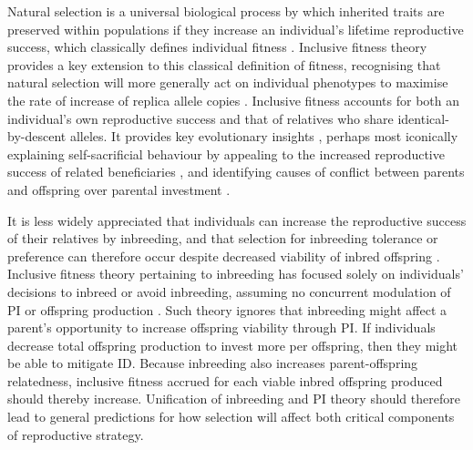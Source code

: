 \documentclass[12pt]{article}
\begin{document}
Natural selection is a universal biological process by which inherited traits are preserved within populations if they increase an individual's lifetime reproductive success, which classically defines individual fitness \cite[][]{Darwin1859, Dawkins1982}. Inclusive fitness theory \cite[][]{Hamilton1964, Hamilton1964a} provides a key extension to this classical definition of fitness, recognising that natural selection will more generally act on individual phenotypes to maximise the rate of increase of replica allele copies \cite[][]{Grafen2006}. Inclusive fitness accounts for both an individual's own reproductive success and that of relatives who share identical-by-descent alleles. It provides key evolutionary insights \cite[][]{Gardner2014}, perhaps most iconically explaining self-sacrificial behaviour by appealing to the increased reproductive success of related beneficiaries \cite[][]{Hamilton1964}, and identifying causes of conflict between parents and offspring over parental investment \cite[hereafter `PI';][]{Trivers1972, Trivers1974}. %

It is less widely appreciated that individuals can increase the reproductive success of their relatives by inbreeding, and that selection for inbreeding tolerance or preference can therefore occur despite decreased viability of inbred offspring \cite[i.e., ``inbreeding depression'', hereafter `ID';][]{Parker1979}. Inclusive fitness theory pertaining to inbreeding has focused solely on individuals' decisions to inbreed or avoid inbreeding, assuming no concurrent modulation of PI or offspring production \cite[e.g.,][]{Parker2006, Kokko2006, Duthie2015a}. Such theory ignores that inbreeding might affect a parent's opportunity to increase offspring viability through PI. If individuals decrease total offspring production to invest more per offspring, then they might be able to mitigate ID. Because inbreeding also increases parent-offspring relatedness, inclusive fitness accrued for each viable inbred offspring produced should thereby increase. Unification of inbreeding and PI theory should therefore lead to general predictions for how selection will affect both critical components of reproductive strategy.
\end{document}
